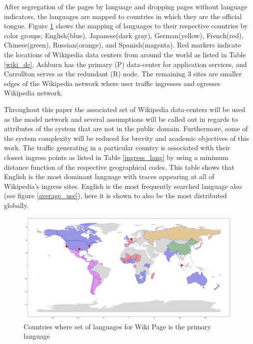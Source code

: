 \documentclass[conference]{IEEEtran}
\begin{document}
After segregation of the pages by language and dropping pages without language indicators, the languages are mapped to countries in which they are the official tongue. Figure \ref{world} shows the mapping of languages to their respective countries by color groups; English(blue), Japanese(dark gray), German(yellow), French(red), Chinese(green), Russian(orange), and Spanish(magenta). Red markers indicate the locations of Wikipedia data centers from around the world as listed in Table \ref{wiki_dc}. Ashburn has the primary (P) data-center for application services, and Carrollton serves as the redundant (R) node. The remaining 3 sites are smaller edges of the Wikipedia network where user traffic ingresses and egresses Wikipedia network. 

Throughout this paper the associated set of Wikipedia data-centers will be used as the model network and several assumptions will be called out in regards to attributes of the system that are not in the public domain. Furthermore, some of the system complexity will be reduced for brevity and academic objectives of this work. The traffic generating in a particular country is associated with their closest ingress points as listed in Table \ref{ingress_lang} by using a minimum distance function of the respective geographical codes. This table shows that English is the most dominant language with traces appearing at all of Wikipedia's ingress sites. English is the most frequently searched language also (see figure \ref{average_use}), here it is shown to also be the most distributed globally.

\begin{figure}[htbp]
\centering
\includegraphics[scale=.15] {world.eps}
\caption{Countries where set of languages for Wiki Page is the primary language}
\label{world}
\end{figure}
\end{document}
